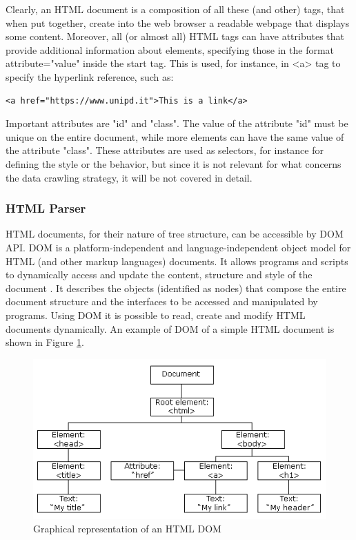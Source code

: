 Clearly, an \ac{HTML} document is a composition of all these (and other) tags, that when put together, create into the web browser a readable webpage that displays some content. Moreover, all (or almost all) \ac{HTML} tags can have attributes that provide additional information about elements, specifying those in the format attribute="value" inside the start tag. This is used, for instance, in <a> tag to specify the hyperlink reference, such as:
\begin{lstlisting}
<a href="https://www.unipd.it">This is a link</a>
\end{lstlisting}
Important attributes are  "id" and "class". The value of the attribute "id"  must be unique on the entire document, while more elements can have the same value of the attribute "class". These attributes are used as selectors, for instance for defining the style or the behavior, but since it is not relevant for what concerns the data crawling strategy, it will be not covered in detail.\\


\subsubsection{HTML Parser}

HTML documents, for their nature of tree structure, can be accessible by \ac{DOM} \ac{API}. \ac{DOM} is a platform-independent and language-independent object model for HTML (and other markup languages) documents. It allows programs and scripts to dynamically access and update the content, structure and style of the document \cite{html-dom}. It describes the objects (identified as nodes) that compose the entire document structure and the interfaces to be accessed and manipulated by programs. Using \ac{DOM} it is possible to read, create and modify \ac{HTML} documents dynamically. An example of \ac{DOM} of a simple HTML document is shown in Figure \ref{fig:html-dom}.

\begin{figure}[ht]
	\centering
	\includegraphics[width=1\textwidth]{figures/html-dom.png}
	\caption{Graphical representation of an HTML DOM}
	\label{fig:html-dom}
\end{figure}

